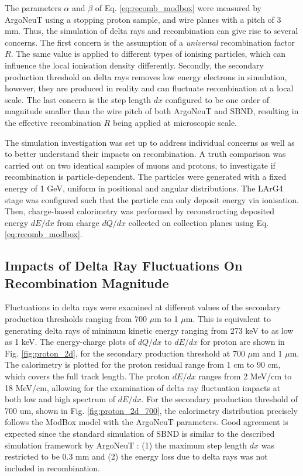 The parameters $\alpha$ and $\beta$ of Eq. \ref{eq:recomb_modbox} were measured by ArgoNeuT using a stopping proton sample, and wire planes with a pitch of 3 mm.
Thus, the simulation of delta rays and recombination can give rise to several concerns.                                                                                                       
The first concern is the assumption of a \textit{universal} recombination factor $R$.
The same value is applied to different types of ionising particles, which can influence the local ionisation density differently. 
Secondly, the secondary production threshold on delta rays removes low energy electrons in simulation, however, they are produced in reality and can fluctuate recombination at a local scale. 
The last concern is the step length $dx$ configured to be one order of magnitude smaller than the wire pitch of both ArgoNeuT and SBND, resulting in the effective recombination $R$ being applied at microscopic scale.                                                                                                                     

The simulation investigation was set up to address individual concerns as well as to better understand their impacts on recombination.    
A truth comparison was carried out on two identical samples of muons and protons, to investigate if recombination is particle-dependent.
The particles were generated with a fixed energy of 1 GeV, uniform in positional and angular distributions.
The LArG4 stage was configured such that the particle can only deposit energy via ionisation.
Then, charge-based calorimetry was performed by reconstructing deposited energy $dE/dx$ from charge $dQ/dx$ collected on collection planes using Eq. \ref{eq:recomb_modbox}.

\subsection{Impacts of Delta Ray Fluctuations On Recombination Magnitude}
\label{sec:impactDeltaRayMag}

Fluctuations in delta rays were examined at different values of the secondary production thresholds ranging from 700 $\mu$m to 1 $\mu$m.
This is equivalent to generating delta rays of minimum kinetic energy ranging from 273 keV to as low as 1 keV.
The energy-charge plots of $dQ/dx$ to $dE/dx$ for proton are shown in Fig. \ref{fig:proton_2d}, for the secondary production threshold at 700 $\mu$m and 1 $\mu$m.
The calorimetry is plotted for the proton residual range from 1 cm to 90 cm, which covers the full track length. 
The proton $dE/dx$ ranges from 2 MeV/cm to 18 MeV/cm, allowing for the examination of delta ray fluctuation impacts at both low and high spectrum of $dE/dx$. 
For the secondary production threshold of 700 um, shown in Fig. \ref{fig:proton_2d_700}, the calorimetry distribution precisely follows the ModBox model with the ArgoNeuT parameters.
Good agreement is expected since the standard simulation of SBND is similar to the described simulation framework by ArgoNeuT \cite{argoneut_recomb}: (1) the maximum step length $dx$ was restricted to be 0.3 mm and (2) the energy loss due to delta rays was not included in recombination.
  
